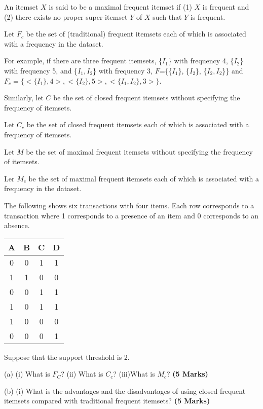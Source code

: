 \documentclass[en,black,normal,10pt]{elegantnote}
\begin{document}
An itemset $X$ is said to be a maximal frequent itemset
if (1) $X$ is frequent
and (2) there exists no proper super-itemset $Y$ of $X$ such that $Y$ is frequent.

Let $F_c$ be the set of (traditional) frequent itemsets each of which is associated with a frequency in the dataset.

For example, if there are three frequent itemsets, \{$I_1$\} with frequency 4,
\{$I_2$\} with frequency 5, and \{$I_1, I_2$\} with frequency 3,
$F$=\{\{$I_1$\}, \{$I_2$\}, \{$I_2, I_2$\}\}
and $F_c = \{<\{I_1\}, 4>, <\{I_2\}, 5>, <\{I_1, I_2\}, 3>\}$.

Similarly, let $C$ be the set of closed frequent itemsets without specifying the frequency of itemsets.

Let $C_c$ be the set of closed frequent itemsets each of which is associated with a frequency of itemsets.

Let $M$ be the set of maximal frequent itemsets without specifying the frequency of itemsets.

Ler $M_c$ be the set of maximal frequent itemsets each of which is associated with a frequency in the dataset.

\newpage

The following shows six transactions with four items.
Each row corresponds to a transaction where 1 corresponds to a presence of an item and 0 corresponds to an absence.

\begin{tabular}{|c|c|c|c|}
  \hline
    \rowcolor{Gray} %
    A & B & C & D \\
    \hline
    0 & 0 & 1 & 1 \\
    \hline
    1 & 1 & 0 & 0 \\
    \hline
    0 & 0 & 1 & 1 \\
    \hline
    1 & 0 & 1 & 1 \\
    \hline
    1 & 0 & 0 & 0 \\
    \hline
    0 & 0 & 0 & 1 \\
    \hline
\end{tabular}

Suppose that the support threshold is 2.

(a) (i) What is $F_C$? \hspace{1cm} (ii) What is $C_c$? \hspace{1cm} (iii)What is $M_c$? \textbf{(5 Marks)}

(b) (i) What is the advantages and the disadvantages of using closed frequent itemsets compared with traditional frequent itemsets? \textbf{(5 Marks)}
\end{document}

